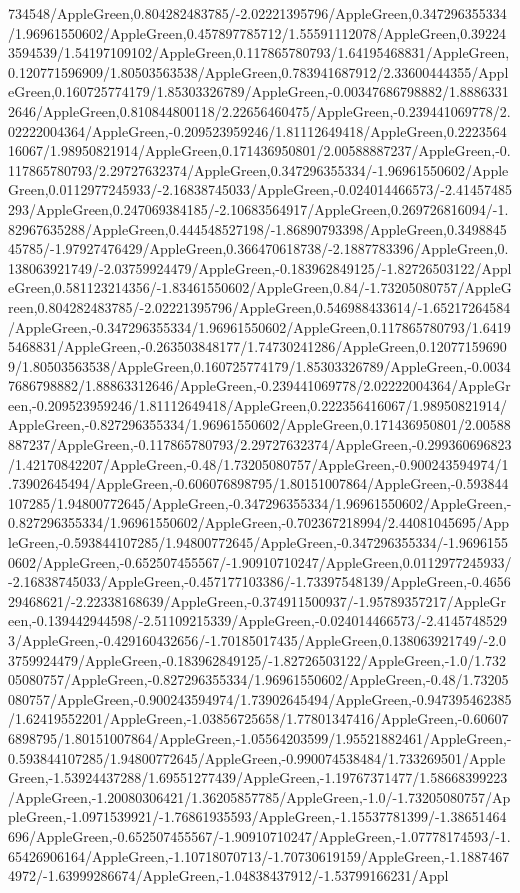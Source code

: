 {\begin{tikzternal}
734548/AppleGreen,0.804282483785/-2.02221395796/AppleGreen,0.347296355334/1.96961550602/AppleGreen,0.457897785712/1.55591112078/AppleGreen,0.392243594539/1.54197109102/AppleGreen,0.117865780793/1.64195468831/AppleGreen,0.120771596909/1.80503563538/AppleGreen,0.783941687912/2.33600444355/AppleGreen,0.160725774179/1.85303326789/AppleGreen,-0.00347686798882/1.88863312646/AppleGreen,0.810844800118/2.22656460475/AppleGreen,-0.239441069778/2.02222004364/AppleGreen,-0.209523959246/1.81112649418/AppleGreen,0.222356416067/1.98950821914/AppleGreen,0.171436950801/2.00588887237/AppleGreen,-0.117865780793/2.29727632374/AppleGreen,0.347296355334/-1.96961550602/AppleGreen,0.0112977245933/-2.16838745033/AppleGreen,-0.024014466573/-2.41457485293/AppleGreen,0.247069384185/-2.10683564917/AppleGreen,0.269726816094/-1.82967635288/AppleGreen,0.444548527198/-1.86890793398/AppleGreen,0.349884545785/-1.97927476429/AppleGreen,0.366470618738/-2.1887783396/AppleGreen,0.138063921749/-2.03759924479/AppleGreen,-0.183962849125/-1.82726503122/AppleGreen,0.581123214356/-1.83461550602/AppleGreen,0.84/-1.73205080757/AppleGreen,0.804282483785/-2.02221395796/AppleGreen,0.546988433614/-1.65217264584/AppleGreen,-0.347296355334/1.96961550602/AppleGreen,0.117865780793/1.64195468831/AppleGreen,-0.263503848177/1.74730241286/AppleGreen,0.120771596909/1.80503563538/AppleGreen,0.160725774179/1.85303326789/AppleGreen,-0.00347686798882/1.88863312646/AppleGreen,-0.239441069778/2.02222004364/AppleGreen,-0.209523959246/1.81112649418/AppleGreen,0.222356416067/1.98950821914/AppleGreen,-0.827296355334/1.96961550602/AppleGreen,0.171436950801/2.00588887237/AppleGreen,-0.117865780793/2.29727632374/AppleGreen,-0.299360696823/1.42170842207/AppleGreen,-0.48/1.73205080757/AppleGreen,-0.900243594974/1.73902645494/AppleGreen,-0.606076898795/1.80151007864/AppleGreen,-0.593844107285/1.94800772645/AppleGreen,-0.347296355334/1.96961550602/AppleGreen,-0.827296355334/1.96961550602/AppleGreen,-0.702367218994/2.44081045695/AppleGreen,-0.593844107285/1.94800772645/AppleGreen,-0.347296355334/-1.96961550602/AppleGreen,-0.652507455567/-1.90910710247/AppleGreen,0.0112977245933/-2.16838745033/AppleGreen,-0.457177103386/-1.73397548139/AppleGreen,-0.465629468621/-2.22338168639/AppleGreen,-0.374911500937/-1.95789357217/AppleGreen,-0.139442944598/-2.51109215339/AppleGreen,-0.024014466573/-2.41457485293/AppleGreen,-0.429160432656/-1.70185017435/AppleGreen,0.138063921749/-2.03759924479/AppleGreen,-0.183962849125/-1.82726503122/AppleGreen,-1.0/1.73205080757/AppleGreen,-0.827296355334/1.96961550602/AppleGreen,-0.48/1.73205080757/AppleGreen,-0.900243594974/1.73902645494/AppleGreen,-0.947395462385/1.62419552201/AppleGreen,-1.03856725658/1.77801347416/AppleGreen,-0.606076898795/1.80151007864/AppleGreen,-1.05564203599/1.95521882461/AppleGreen,-0.593844107285/1.94800772645/AppleGreen,-0.990074538484/1.733269501/AppleGreen,-1.53924437288/1.69551277439/AppleGreen,-1.19767371477/1.58668399223/AppleGreen,-1.20080306421/1.36205857785/AppleGreen,-1.0/-1.73205080757/AppleGreen,-1.0971539921/-1.76861935593/AppleGreen,-1.15537781399/-1.38651464696/AppleGreen,-0.652507455567/-1.90910710247/AppleGreen,-1.07778174593/-1.65426906164/AppleGreen,-1.10718070713/-1.70730619159/AppleGreen,-1.18874674972/-1.63999286674/AppleGreen,-1.04838437912/-1.53799166231/Appl
\end{tikzternal}}
